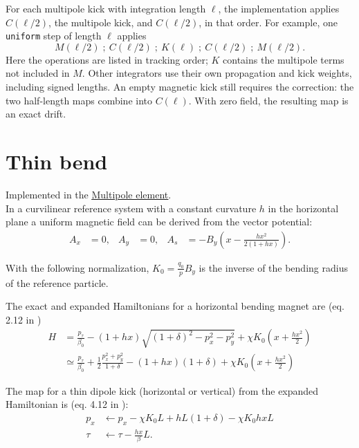 For each multipole kick with integration length $\ell$, the implementation
applies $C(\ell/2)$, the multipole kick, and $C(\ell/2)$, in that order.
For example, one \texttt{uniform} step of length $\ell$ applies
\begin{equation}
  M(\ell/2)\;;\ C(\ell/2)\;;\ K(\ell)\;;\ C(\ell/2)\;;\ M(\ell/2).
\end{equation}
Here the operations are listed in tracking order; $K$ contains the multipole
terms not included in $M$. Other integrators use their own propagation and
kick weights, including signed lengths. An empty magnetic kick still requires
the correction: the two half-length maps combine into $C(\ell)$. With zero
field, the resulting map is an exact drift.

\section{Thin bend}

Implemented in the \href{https://xsuite.readthedocs.io/en/latest/apireference.html#multipole}{\underline{Multipole element}}.
~\\

In a curvilinear reference system with a constant curvature $h$ in the
horizontal plane a uniform magnetic field can be derived from the vector potential:
\begin{align}
  A_x & = 0, & A_y & = 0, & A_s & =
  - B_y \left(x-\frac{h x^2}{2 (1+h x)}\right).
\end{align}

With the following normalization, $K_0=\frac{q_0}{p} B_y$ is the inverse of the bending
radius of the reference particle.

The exact and expanded Hamiltonians for a horizontal bending magnet are (eq. 2.12 in
\cite{barber87})
\begin{align}
  H &= \frac{p_\tau}{\beta_0}
       - (1+h x)\sqrt{(1+\delta)^2 -p_x^2 - p_y^2}
       + \chi K_0 \left( x + \frac{h x^2}{2} \right)  \\
    &\simeq   \frac{p_\tau}{\beta_0}
    + \frac{1}{2}\frac{p_x^2+p_y^2}{1+\delta}
  - (1+h x) (1+\delta) + \chi K_0 \left( x + \frac{h x^2}{2} \right)
\end{align}


The map for a thin dipole kick (horizontal or vertical) from the expanded Hamiltonian is
(eq. 4.12 in \cite{heinemann95}):
\begin{align}
  p_x &\leftarrow p_x - \chi K_0 L + h L (1 + \delta)  - \chi K_0  h x L\\
  \tau &\leftarrow \tau - \frac{h x}{\beta}  L.
\end{align}



